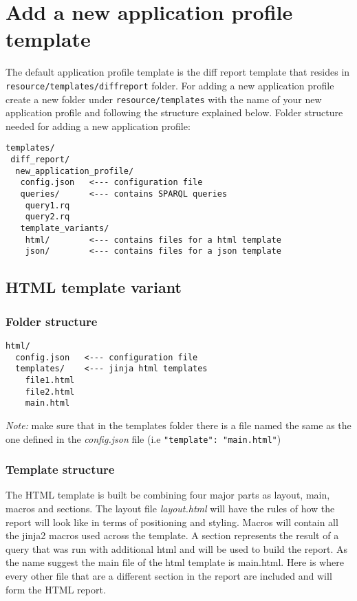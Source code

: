 \section{Add a new application profile template}

The default application profile template is the diff report template that resides in \texttt{resource\slash templates\slash diff\textunderscore report} folder. For adding a new application profile create a new folder under \texttt{resource\slash templates} with the name of your new application profile and following the structure explained below.
Folder structure needed for adding a new application profile:

\begin{lstlisting}
templates/
 diff_report/
  new_application_profile/
   config.json   <--- configuration file
   queries/      <--- contains SPARQL queries
    query1.rq
    query2.rq
   template_variants/
    html/        <--- contains files for a html template
    json/        <--- contains files for a json template
\end{lstlisting}

\subsection{HTML template variant}
\subsubsection{Folder structure}

\begin{lstlisting}
html/
  config.json   <--- configuration file
  templates/    <--- jinja html templates
    file1.html
    file2.html
    main.html
\end{lstlisting}

\textit{Note:} make sure that in the templates folder there is a file named the same as the one defined in the \textit{config.json} file (i.e \texttt{"template": "main.html"})

\subsubsection{Template structure}

The HTML template is built be combining four major parts as layout, main, macros and sections. The layout file \textit{layout.html} will have the rules of how the report will look like in terms of positioning and styling. Macros will contain all the jinja2 macros used across the template. A section represents the result of a query that was run with additional html and will be used to build the report. As the name suggest the main file of the html template is main.html. Here is where every other file that are a different section in the report are included and will form the HTML report.

